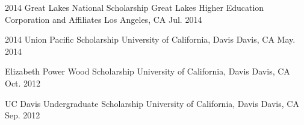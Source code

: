 



\begin{cvhonors}

  \cvhonor
    {2014 Great Lakes National Scholarship} %
    {Great Lakes Higher Education Corporation and Affiliates} %
    {Los Angeles, CA} %
    {Jul. 2014} %

\end{cvhonors}




\begin{cvhonors}

  \cvhonor
    {2014 Union Pacific Scholarship} %
    {University of California, Davis} %
    {Davis, CA} %
    {May. 2014} %

  \cvhonor
    {Elizabeth Power Wood Scholarship} %
    {University of California, Davis} %
    {Davis, CA} %
    {Oct. 2012} %

  \cvhonor
    {UC Davis Undergraduate Scholarship} %
    {University of California, Davis} %
    {Davis, CA} %
    {Sep. 2012} %

\end{cvhonors}


